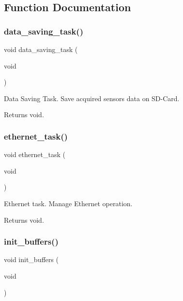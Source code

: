 \subsection{Function Documentation}
\mbox{\label{rmap_8ino_a1c6cee0cbd43bbe1215f13cab2434347}} 
\subsubsection{\texorpdfstring{data\+\_\+saving\+\_\+task()}{data\_saving\_task()}}
{\footnotesize\ttfamily void data\+\_\+saving\+\_\+task (\begin{DoxyParamCaption}\item[{void}]{ }\end{DoxyParamCaption})}



Data Saving Task. Save acquired sensors data on S\+D-\/\+Card. 

\begin{DoxyReturn}{Returns}
void. 
\end{DoxyReturn}
\mbox{\label{rmap_8ino_abac8959915b759aa6429243ab9599ee3}} 
\subsubsection{\texorpdfstring{ethernet\+\_\+task()}{ethernet\_task()}}
{\footnotesize\ttfamily void ethernet\+\_\+task (\begin{DoxyParamCaption}\item[{void}]{ }\end{DoxyParamCaption})}



Ethernet task. Manage Ethernet operation. 

\begin{DoxyReturn}{Returns}
void. 
\end{DoxyReturn}
\mbox{\label{rmap_8ino_ad241cc00b1a92e6d85827df96778e442}} 
\subsubsection{\texorpdfstring{init\+\_\+buffers()}{init\_buffers()}}
{\footnotesize\ttfamily void init\+\_\+buffers (\begin{DoxyParamCaption}\item[{void}]{ }\end{DoxyParamCaption})}



